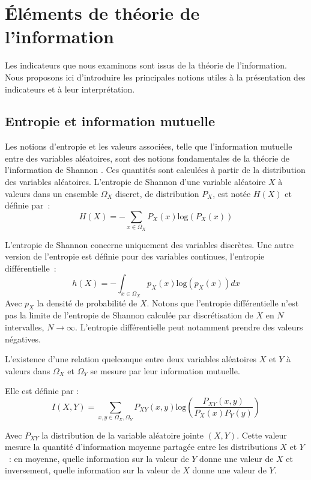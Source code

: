 \documentclass[../main]{subfiles}
\begin{document}
\section{\'Eléments de théorie de l'information}

Les indicateurs que nous examinons sont issus de la théorie de l'information. Nous proposons ici d'introduire les principales notions utiles à la présentation des indicateurs et à leur interprétation.

\subsection{Entropie et information mutuelle}

Les notions d'entropie et les valeurs associées, telle que l'information mutuelle entre des variables aléatoires, sont des notions fondamentales de la théorie de l'information de Shannon \parencite{Shannon1948AMT}. Ces quantités sont calculées à partir de la distribution des variables aléatoires.
L'entropie de Shannon d'une variable aléatoire $X$ à valeurs dans un ensemble $\Omega_X$ discret, de distribution $P_X$, est notée $H(X)$ et définie par~: 
\begin{equation}\label{eq:H}
H(X) = - \sum_{x \in \Omega_X}{P_X(x)\textrm{log}(P_X(x))}
\end{equation}

L'entropie de Shannon concerne uniquement des variables discrètes.
Une autre version de l'entropie est définie pour des variables continues, l'entropie différentielle~:
\begin{equation}
    h(X) = - \int_{x \in \Omega_X}{p_X(x)\textrm{log}(p_X(x))dx}
\end{equation}
Avec $p_X$ la densité de probabilité de $X$.
Notons que l'entropie différentielle n'est pas la limite de l'entropie de Shannon calculée par discrétisation de $X$ en $N$ intervalles, $N \rightarrow \infty$. L'entropie différentielle peut notamment prendre des valeurs négatives.

L'existence d'une relation quelconque entre deux variables aléatoires $X$ et $Y$ à valeurs dans $\Omega_X$ et $\Omega_Y$ se mesure par leur information mutuelle.

Elle est définie par : 
\begin{equation}\label{eq:MI}
 I(X,Y) = \sum_{x,y \in \Omega_X,\Omega_Y}{P_{XY}(x,y)\textrm{log}(\frac{P_{XY}(x,y)}{P_X(x)P_Y(y)})}
\end{equation}

Avec $P_{XY}$ la distribution de la variable aléatoire jointe $(X,Y)$.
Cette valeur mesure la quantité d'information moyenne partagée entre les distributions $X$ et $Y$~: en moyenne, quelle information sur la valeur de $Y$ donne une valeur de $X$ et inversement, quelle information sur la valeur de $X$ donne une valeur de $Y$.
\end{document}
